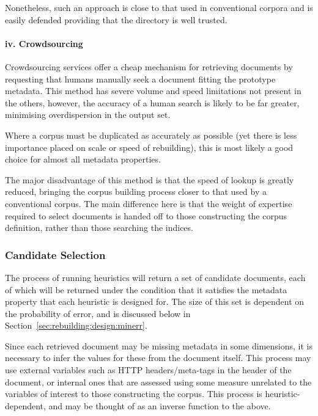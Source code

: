 Nonetheless, such an approach is close to that used in conventional corpora and is easily defended providing that the directory is well trusted.

\paragraph{iv. Crowdsourcing}
Crowdsourcing services offer a cheap mechanism for retrieving documents by requesting that humans manually seek a document fitting the prototype metadata.  This method has severe volume and speed limitations not present in the others, however, the accuracy of a human search is likely to be far greater, minimising overdispersion in the output set.

Where a corpus must be duplicated as accurately as possible (yet there is less importance placed on scale or speed of rebuilding), this is most likely a good choice for almost all metadata properties.

The major disadvantage of this method is that the speed of lookup is greatly reduced, bringing the corpus building process closer to that used by a conventional corpus.  The main difference here is that the weight of expertise required to select documents is handed off to those constructing the corpus definition, rather than those searching the indices.







\subsubsection{Candidate Selection}
The process of running heuristics will return a set of candidate documents, each of which will be returned under the condition that it satisfies the metadata property that each heuristic is designed for.  The size of this set is dependent on the probability of error, and is discussed below in Section~\ref{sec:rebuilding:design:minerr}.

Since each retrieved document may be missing metadata in some dimensions, it is necessary to infer the values for these from the document itself.  This process may use external variables such as HTTP headers/meta-tags in the header of the document, or internal ones that are assessed using some measure unrelated to the variables of interest to those constructing the corpus.  This process is heuristic-dependent, and may be thought of as an inverse function to the above.

